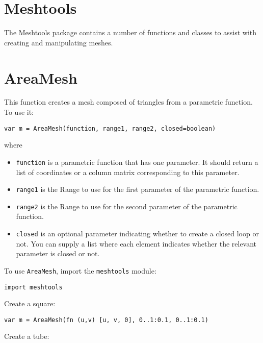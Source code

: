 \hypertarget{meshtools}{%
\section{Meshtools}\label{meshtools}}

The Meshtools package contains a number of functions and classes to
assist with creating and manipulating meshes.

\hypertarget{areamesh}{%
\section{AreaMesh}\label{areamesh}}

This function creates a mesh composed of triangles from a parametric
function. To use it:

\begin{lstlisting}
var m = AreaMesh(function, range1, range2, closed=boolean)
\end{lstlisting}

where

\begin{itemize}

\item
  \texttt{function} is a parametric function that has one parameter. It
  should return a list of coordinates or a column matrix corresponding
  to this parameter.
\item
  \texttt{range1} is the Range to use for the first parameter of the
  parametric function.
\item
  \texttt{range2} is the Range to use for the second parameter of the
  parametric function.
\item
  \texttt{closed} is an optional parameter indicating whether to create
  a closed loop or not. You can supply a list where each element
  indicates whether the relevant parameter is closed or not.
\end{itemize}

To use \texttt{AreaMesh}, import the \texttt{meshtools} module:

\begin{lstlisting}
import meshtools
\end{lstlisting}

Create a square:

\begin{lstlisting}
var m = AreaMesh(fn (u,v) [u, v, 0], 0..1:0.1, 0..1:0.1)
\end{lstlisting}

Create a tube:

